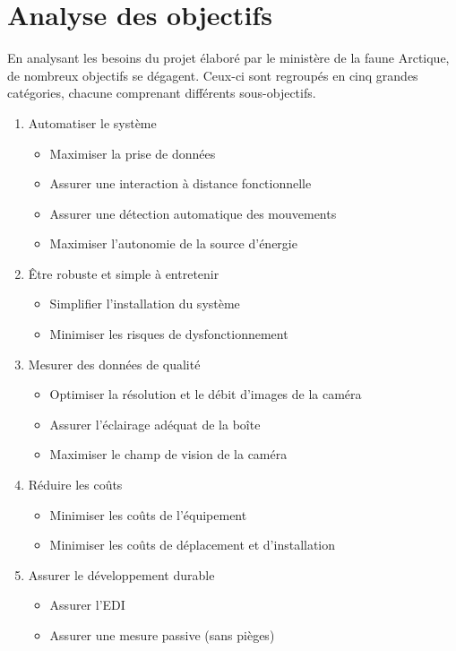 \section{Analyse des objectifs}

En analysant les besoins du projet élaboré par le ministère de la faune
Arctique, de nombreux objectifs se dégagent. Ceux-ci sont regroupés en cinq
grandes catégories, chacune comprenant différents sous-objectifs.

\begin{enumerate}

  \item Automatiser le système
    \begin{itemize}[label=\textbullet]
      \item Maximiser la prise de données
      \item Assurer une interaction à distance fonctionnelle
      \item Assurer une détection automatique des mouvements
      \item Maximiser l’autonomie de la source d’énergie
    \end{itemize}

  \item Être robuste et simple à entretenir
    \begin{itemize}[label=\textbullet]
      \item Simplifier l’installation du système
      \item Minimiser les risques de dysfonctionnement
    \end{itemize}

  \item Mesurer des données de qualité
    \begin{itemize}[label=\textbullet]
      \item Optimiser la résolution et le débit d’images de la caméra
      \item Assurer l’éclairage adéquat de la boîte
      \item Maximiser le champ de vision de la caméra
    \end{itemize}

  \item Réduire les coûts
    \begin{itemize}[label=\textbullet]
      \item Minimiser les coûts de l’équipement
      \item Minimiser les coûts de déplacement et d’installation
    \end{itemize}

  \item Assurer le développement durable
    \begin{itemize}[label=\textbullet]
      \item Assurer l’EDI
      \item Assurer une mesure passive (sans pièges)
    \end{itemize}

\end{enumerate}

